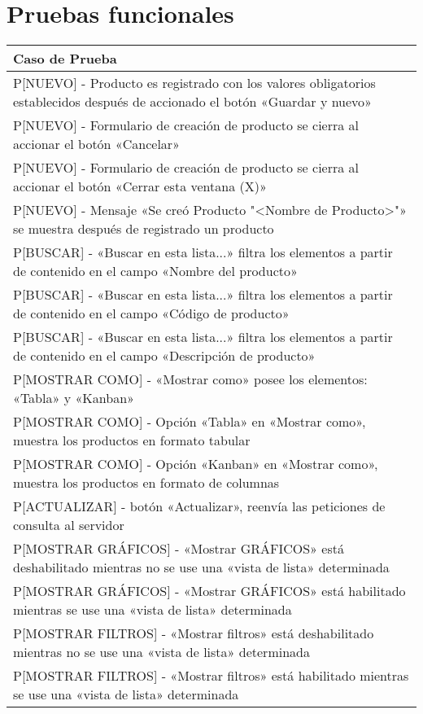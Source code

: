 \section{Pruebas funcionales}

\begin{longtable}{|p{15.0cm}|}
\hline
\textbf{Caso de Prueba} \\
\hline
P[NUEVO] - Producto es registrado con los valores obligatorios establecidos después de accionado el botón «Guardar y nuevo» \\ \hline
P[NUEVO] - Formulario de creación de producto se cierra al accionar el botón «Cancelar» \\ \hline
P[NUEVO] - Formulario de creación de producto se cierra al accionar el botón «Cerrar esta ventana (X)» \\ \hline
P[NUEVO] - Mensaje «Se creó Producto "<Nombre de Producto>"» se muestra después de registrado un producto \\ \hline
P[BUSCAR] - «Buscar en esta lista...» filtra los elementos a partir de contenido en el campo «Nombre del producto» \\ \hline
P[BUSCAR] - «Buscar en esta lista...» filtra los elementos a partir de contenido en el campo «Código de producto» \\ \hline
P[BUSCAR] - «Buscar en esta lista...» filtra los elementos a partir de contenido en el campo «Descripción de producto» \\ \hline
P[MOSTRAR COMO] - «Mostrar como» posee los elementos: «Tabla» y «Kanban» \\ \hline
P[MOSTRAR COMO] - Opción «Tabla» en «Mostrar como», muestra los productos en formato tabular \\ \hline
P[MOSTRAR COMO] - Opción «Kanban» en «Mostrar como», muestra los productos en formato de columnas \\ \hline
P[ACTUALIZAR] - botón «Actualizar», reenvía las peticiones de consulta al servidor \\ \hline
P[MOSTRAR GRÁFICOS] - «Mostrar GRÁFICOS» está deshabilitado mientras no se use una «vista de lista» determinada \\ \hline
P[MOSTRAR GRÁFICOS] - «Mostrar GRÁFICOS» está habilitado mientras se use una «vista de lista» determinada \\ \hline
P[MOSTRAR FILTROS] - «Mostrar filtros» está deshabilitado mientras no se use una «vista de lista» determinada \\ \hline
P[MOSTRAR FILTROS] - «Mostrar filtros» está habilitado mientras se use una «vista de lista» determinada \\ \hline

\end{longtable}

